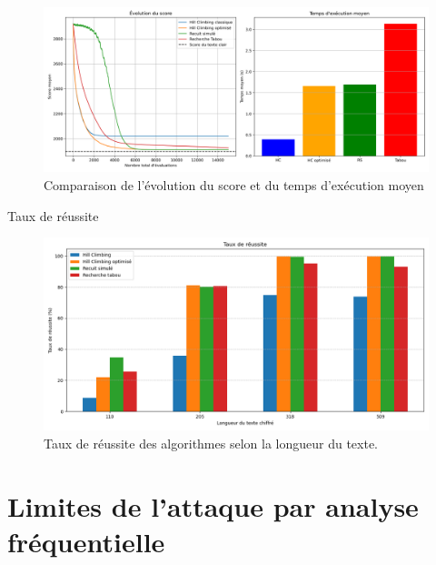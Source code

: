 \documentclass[a4paper]{article}
\begin{document}
\begin{figure}[H]
    \centering
    \includegraphics[width=\textwidth, keepaspectratio, height=\textheight]{comparaison_algorithmes_et_temps.png}
    \caption{Comparaison de l'évolution du score et du temps d'exécution moyen}
    \label{fig:score-temps}
\end{figure}

Taux de réussite

\begin{figure}[H]
    \centering
    \includegraphics[width=\textwidth, keepaspectratio, height=\textheight]{taux_reussite.png}
    \caption{Taux de réussite des algorithmes selon la longueur du texte.}
    \label{fig:tous-reussite}
\end{figure}
\section{Limites de l'attaque par analyse fréquentielle}
\end{document}
